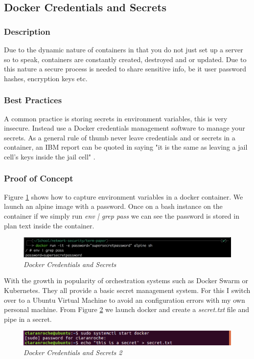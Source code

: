 \subsection{Docker Credentials and Secrets}
\label{sub:cred-secre}
\subsubsection{Description}
Due to the dynamic nature of containers in that you do not just set up a server so to speak, containers are constantly created, destroyed and or updated. Due to this nature a secure process is needed to share sensitive info, be it user password hashes, encryption keys etc.
\subsubsection{Best Practices}
A common practice is storing secrets in environment variables, this is very insecure. Instead use a Docker credentials management software to manage your secrets. As a general rule of thumb never leave credentials and or secrets in a container, an IBM report can be quoted in saying "it is the same as leaving a jail cell's keys inside the jail cell" \citep{ibm}.
\subsubsection{Proof of Concept}
Figure \ref{img:demo18} shows how to capture environment variables in a docker container. We launch an alpine image with a password. Once on a bash instance on the container if we simply run \textit{env | grep pass} we can see the password is stored in plan text inside the container.
\begin{figure}[!ht]
\centering
\includegraphics*[width=\textwidth]{images/term18.png}
\caption{\em Docker Credentials and Secrets}
\label{img:demo18}
\end{figure}

With the growth in popularity of orchestration systems such as Docker Swarm or Kubernetes. They all provide a basic secret management system. For this I switch over to a Ubuntu Virtual Machine to avoid an configuration errors with my own personal machine. From Figure \ref{img:demo19} we launch docker and create a \textit{secret.txt} file and pipe in a secret.
\begin{figure}[!ht]
\centering
\includegraphics*[width=\textwidth]{images/term19.png}
\caption{\em Docker Credentials and Secrets 2}
\label{img:demo19}
\end{figure}

